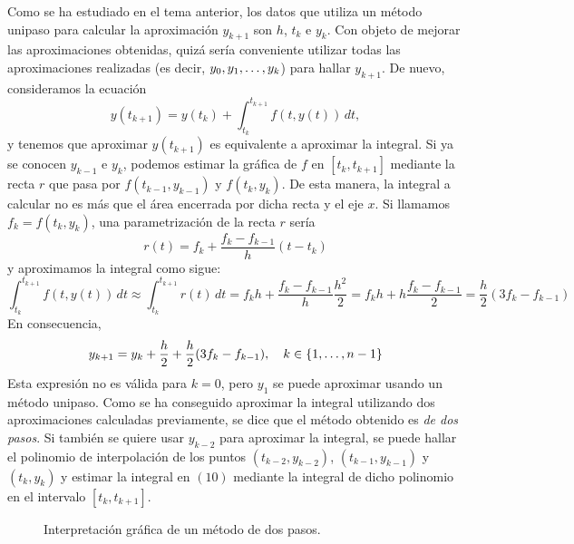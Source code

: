 \documentclass[11pt]{report}
\theoremstyle{mytheorem}
\theoremstyle{mydefinition}
\theoremstyle{myexample}
\begin{document}
Como se ha estudiado en el tema anterior, los datos que utiliza un método unipaso para calcular la aproximación $y_{k+1}$ son $h$, $t_k$ e $y_k$. Con objeto de mejorar las aproximaciones obtenidas, quizá sería conveniente utilizar todas las aproximaciones realizadas (es decir, $y_0,y_1,\mathellipsis,y_k$) para hallar $y_{k+1}$. De nuevo, consideramos la ecuación
\begin{equation}y(t_{k+1}) = y(t_k)+\int_{t_k}^{t_{k+1}}f(t,y(t)) \, dt,\end{equation}
y tenemos que aproximar $y(t_{k+1})$ es equivalente a aproximar la integral. Si ya se conocen $y_{k-1}$ e $y_k$, podemos estimar la gráfica de $f$ en $[t_k,t_{k+1}]$ mediante la recta $r$ que pasa por $f(t_{k-1},y_{k-1})$ y $f(t_k,y_k)$. De esta manera, la integral a calcular no es más que el área encerrada por dicha recta y el eje $x$. Si llamamos $f_k = f(t_k,y_k)$, una parametrización de la recta $r$ sería \[r(t) = f_k+\frac{f_k-f_{k-1}}{h}(t-t_k)\] y aproximamos la integral como sigue:
\[\int_{t_k}^{t_{k+1}} f(t,y(t)) \, dt \approx \int_{t_k}^{t_{k+1}}r(t) \, dt = f_kh+\frac{f_k-f_{k-1}}{h} \frac{h^2}{2} = f_kh+h\frac{f_k-f_{k-1}}{2} = \frac{h}{2}(3f_k-f_{k-1})\]
En consecuencia,
\[y_{k+1} = y_k +\frac{h}{2}+\frac{h}{2}(3f_k-f_{k-1}), \quad k \in \{1,\mathellipsis,n-1\}\]
Esta expresión no es válida para $k = 0$, pero $y_1$ se puede aproximar usando un método unipaso. Como se ha conseguido aproximar la integral utilizando dos aproximaciones calculadas previamente, se dice que el método obtenido es \emph{de dos pasos}. Si también se quiere usar $y_{k-2}$ para aproximar la integral, se puede hallar el polinomio de interpolación de los puntos $(t_{k-2},y_{k-2})$, $(t_{k-1},y_{k-1})$ y $(t_k,y_k)$ y estimar la integral en $(10)$ mediante la integral de dicho polinomio en el intervalo $[t_k,t_{k+1}]$.

\begin{figure}[H]
\centering
{}
\caption{Interpretación gráfica de un método de dos pasos.}
\end{figure}
\end{document}
